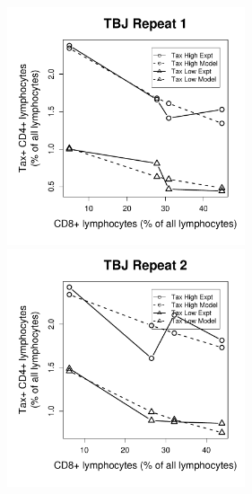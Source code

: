 \begin{figure}[htp]
\includegraphics[width=7cm]{./Figures/chapter5/figure_lysis_tbj_rep_1}%
\hspace{0cm}%
\includegraphics[width=7cm]{./Figures/chapter5/figure_lysis_tbj_rep_2} \\
\end{figure}

